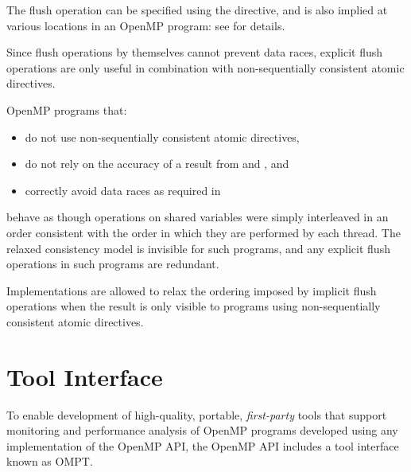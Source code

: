 The flush operation can be specified using the  directive, and is also implied at 
various locations in an OpenMP program: see  for details.

\begin{note}
Since flush operations by themselves cannot prevent data races, explicit flush 
operations are only useful in combination with non-sequentially consistent atomic 
directives.
\end{note}

OpenMP programs that:

\begin{itemize}[rightmargin=11ex]
\item do not use non-sequentially consistent atomic directives,

\item do not rely on the accuracy of a  result from 
 and , and

\item correctly avoid data races as required in  
\end{itemize}

behave as though operations on shared variables were simply interleaved in an order 
consistent with the order in which they are performed by each thread. The relaxed 
consistency model is invisible for such programs, and any explicit flush operations in 
such programs are redundant.

Implementations are allowed to relax the ordering imposed by implicit flush operations 
when the result is only visible to programs using non-sequentially consistent atomic 
directives.




\section{Tool Interface}
\label{subsec:Tool Support}

To enable development of high-quality, portable, \emph{first-party}
tools that support monitoring and performance
analysis of OpenMP programs developed using any implementation of 
the OpenMP API, the OpenMP API includes a tool interface 
known as OMPT.

